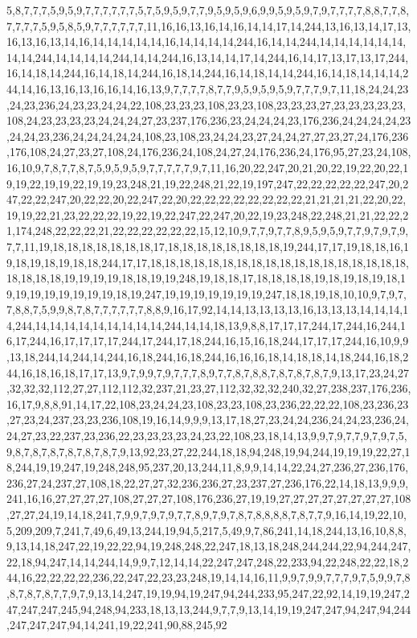 5,8,7,7,7,5,9,5,9,7,7,7,7,7,7,5,7,5,9,5,9,7,7,9,5,9,5,9,6,9,9,5,9,5,9,7,9,7,7,7,7,8,8,7,7,8,7,7,7,7,5,9,5,8,5,9,7,7,7,7,7,7,11,16,16,13,16,14,16,14,14,17,14,244,13,16,13,14,17,13,16,13,16,13,14,16,14,14,14,14,14,16,14,14,14,14,244,16,14,14,244,14,14,14,14,14,14,14,14,244,14,14,14,14,244,14,14,244,16,13,14,14,17,14,244,16,14,17,13,17,13,17,244,16,14,18,14,244,16,14,18,14,244,16,18,14,244,16,14,18,14,14,244,16,14,18,14,14,14,244,14,16,13,16,13,16,16,14,16,13,9,7,7,7,7,8,7,7,9,5,9,5,9,5,9,7,7,7,9,7,11,18,24,24,23,24,23,236,24,23,23,24,24,22,108,23,23,23,108,23,23,108,23,23,23,27,23,23,23,23,23,108,24,23,23,23,23,24,24,24,27,23,237,176,236,23,24,24,24,23,176,236,24,24,24,24,23,24,24,23,236,24,24,24,24,24,108,23,108,23,24,24,23,27,24,24,27,27,23,27,24,176,236,176,108,24,27,23,27,108,24,176,236,24,108,24,27,24,176,236,24,176,95,27,23,24,108,16,10,9,7,8,7,7,8,7,5,9,5,9,5,9,7,7,7,7,7,9,7,11,16,20,22,247,20,21,20,22,19,22,20,22,19,19,22,19,19,22,19,19,23,248,21,19,22,248,21,22,19,197,247,22,22,22,22,22,247,20,247,22,22,247,20,22,22,20,22,247,22,20,22,22,22,22,22,22,22,22,21,21,21,21,22,20,22,19,19,22,21,23,22,22,22,19,22,19,22,247,22,247,20,22,19,23,248,22,248,21,21,22,22,21,174,248,22,22,22,21,22,22,22,22,22,22,15,12,10,9,7,7,9,7,7,8,9,5,9,5,9,7,7,9,7,9,7,9,7,7,11,19,18,18,18,18,18,18,18,17,18,18,18,18,18,18,18,18,19,244,17,17,19,18,18,16,19,18,19,18,19,18,18,244,17,17,18,18,18,18,18,18,18,18,18,18,18,18,18,18,18,18,18,18,18,18,18,18,19,19,19,19,18,18,19,19,248,19,18,18,17,18,18,18,18,19,18,19,18,19,18,19,19,19,19,19,19,19,19,18,19,247,19,19,19,19,19,19,19,247,18,18,19,18,10,10,9,7,9,7,7,8,8,7,5,9,9,8,7,8,7,7,7,7,7,7,8,8,9,16,17,92,14,14,13,13,13,13,16,13,13,13,14,14,14,14,244,14,14,14,14,14,14,14,14,14,244,14,14,18,13,9,8,8,17,17,17,244,17,244,16,244,16,17,244,16,17,17,17,17,244,17,244,17,18,244,16,15,16,18,244,17,17,17,244,16,10,9,9,13,18,244,14,244,14,244,16,18,244,16,18,244,16,16,16,18,14,18,18,14,18,244,16,18,244,16,18,16,18,17,17,13,9,7,9,9,7,9,7,7,7,8,9,7,7,8,7,8,8,7,8,7,8,7,8,7,9,13,17,23,24,27,32,32,32,112,27,27,112,112,32,237,21,23,27,112,32,32,32,240,32,27,238,237,176,236,16,17,9,8,8,91,14,17,22,108,23,24,24,23,108,23,23,108,23,236,22,22,22,108,23,236,23,27,23,24,237,23,23,236,108,19,16,14,9,9,9,13,17,18,27,23,24,24,236,24,24,23,236,24,24,27,23,22,237,23,236,22,23,23,23,23,24,23,22,108,23,18,14,13,9,9,7,9,7,7,9,7,9,7,5,9,8,7,8,7,8,7,8,7,8,7,8,7,9,13,92,23,27,22,244,18,18,94,248,19,94,244,19,19,19,22,27,18,244,19,19,247,19,248,248,95,237,20,13,244,11,8,9,9,14,14,22,24,27,236,27,236,176,236,27,24,237,27,108,18,22,27,27,32,236,236,27,23,237,27,236,176,22,14,18,13,9,9,9,241,16,16,27,27,27,27,108,27,27,27,108,176,236,27,19,19,27,27,27,27,27,27,27,27,108,27,27,24,19,14,18,241,7,9,9,7,9,7,9,7,7,8,9,7,9,7,8,7,8,8,8,8,7,8,7,7,9,16,14,19,22,10,5,209,209,7,241,7,49,6,49,13,244,19,94,5,217,5,49,9,7,86,241,14,18,244,13,16,10,8,8,9,13,14,18,247,22,19,22,22,94,19,248,248,22,247,18,13,18,248,244,244,22,94,244,247,22,18,94,247,14,14,244,14,9,9,7,12,14,14,22,247,247,248,22,233,94,22,248,22,22,18,244,16,22,22,22,22,236,22,247,22,23,23,248,19,14,14,16,11,9,9,7,9,9,7,7,7,9,7,5,9,9,7,8,8,7,8,7,8,7,7,9,7,9,13,14,247,19,19,94,19,247,94,244,233,95,247,22,92,14,19,19,247,247,247,247,245,94,248,94,233,18,13,13,244,9,7,7,9,13,14,19,19,247,247,94,247,94,244,247,247,247,94,14,241,19,22,241,90,88,245,92